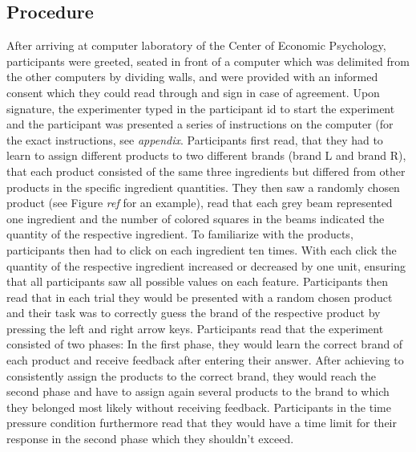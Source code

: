 \documentclass[a4paper,man,natbib]{apa6}
\begin{document}
\subsection{Procedure}
After arriving at computer laboratory of the Center of Economic Psychology, participants were greeted, seated in front of a computer which was delimited from the other computers by dividing walls, and were provided with an informed consent which they could read through and sign in case of agreement. Upon signature, the experimenter typed in the participant id to start the experiment and the participant was presented a series of instructions on the computer (for the exact instructions, see \textit{appendix}. Participants first read, that they had to learn to assign different products to two different brands (brand L and brand R), that each product consisted of the same three ingredients but differed from other products in the specific ingredient quantities. They then saw a randomly chosen product (see Figure \textit{ref} for an example), read that each grey beam represented one ingredient and the number of colored squares in the beams indicated the quantity of the respective ingredient. To familiarize with the products, participants then had to click on each ingredient ten times. With each click the quantity of the respective ingredient increased or decreased by one unit, ensuring that all participants saw all possible values on each feature. Participants then read that in each trial they would be presented with a random chosen product and their task was to correctly guess the brand of the respective product by pressing the left and right arrow keys. Participants read that the experiment consisted of two phases: In the first phase, they would learn the correct brand of each product and receive feedback after entering their answer. After achieving to consistently assign the products to the correct brand, they would reach the second phase and have to assign again several products to the brand to which they belonged most likely without receiving feedback. Participants in the time pressure condition furthermore read that they would have a time limit for their response in the second phase which they shouldn't exceed.
\end{document}
